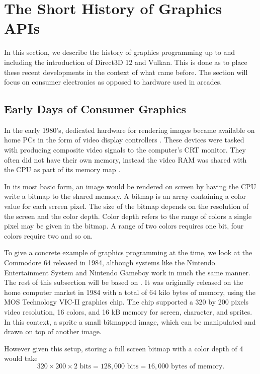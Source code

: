 \section{The Short History of Graphics \acs{API}s}\label{sec:short_history}
In this section, we describe the history of graphics programming up to and including the introduction of Direct3D 12 and Vulkan.
This is done as to place these recent developments in the context of what came before.
The section will focus on consumer electronics as opposed to hardware used in arcades.

\subsection{Early Days of Consumer Graphics}
In the early 1980's, dedicated hardware for rendering images became available on home PCs in the form of video display controllers \cite{wikiVideoDisplayController}.
These devices were tasked with producing composite video signals to the computer’s CRT monitor.
They often did not have their own memory, instead the video RAM was shared with the \gls{CPU} as part of its memory map \cite{wikipedia????shared}.


In its most basic form, an image would be rendered on screen by having the \gls{CPU} write a bitmap to the shared memory.
A bitmap is an array containing a color value for each screen pixel.
The size of the bitmap depends on the resolution of the screen and the color depth.
Color depth refers to the range of colors a single pixel may be given in the bitmap.
A range of two colors requires one bit, four colors require two and so on.


To give a concrete example of graphics programming at the time, we look at the Commodore 64 released in 1984, although systems like the Nintendo Entertainment System and Nintendo Gameboy work in much the same manner.
The rest of this subsection will be based on \citet{commodore1983commodore}.
It was originally released on the home computer market in 1984 with a total of 64 kilo bytes of memory, using the MOS Technology VIC-II graphics chip.
The chip supported a 320 by 200 pixels video resolution, 16 colors, and 16 kB memory for screen, character, and sprites.
In this context, a sprite a small bitmapped image, which can be manipulated and drawn on top of another image.

However given this setup, storing a full screen bitmap with a color depth of 4 would take
$$320\times 200\times 2 \text{ bits} = 128,000 \text{ bits} = 16,000 \text{ bytes of memory.}$$

